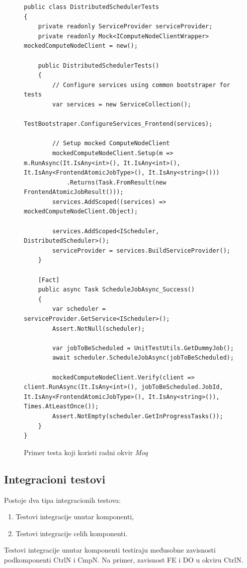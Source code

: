 \documentclass[12pt,oneside]{memoir}
\begin{document}
\begin{figure}[h!]
\centering
\begin{lstlisting}
public class DistributedSchedulerTests
{
	private readonly ServiceProvider serviceProvider;
	private readonly Mock<IComputeNodeClientWrapper> mockedComputeNodeClient = new();

	public DistributedSchedulerTests()
	{
		// Configure services using common bootstraper for tests
		var services = new ServiceCollection();
		TestBootstraper.ConfigureServices_Frontend(services);

		// Setup mocked ComputeNodeClient
		mockedComputeNodeClient.Setup(m => m.RunAsync(It.IsAny<int>(), It.IsAny<int>(), It.IsAny<FrontendAtomicJobType>(), It.IsAny<string>()))
			.Returns(Task.FromResult(new FrontendAtomicJobResult()));
		services.AddScoped((services) => mockedComputeNodeClient.Object);

		services.AddScoped<IScheduler, DistributedScheduler>();
		serviceProvider = services.BuildServiceProvider();
	}

	[Fact]
	public async Task ScheduleJobAsync_Success()
	{
		var scheduler = serviceProvider.GetService<IScheduler>();
		Assert.NotNull(scheduler);

		var jobToBeScheduled = UnitTestUtils.GetDummyJob();
		await scheduler.ScheduleJobAsync(jobToBeScheduled);

		mockedComputeNodeClient.Verify(client => client.RunAsync(It.IsAny<int>(), jobToBeScheduled.JobId, It.IsAny<FrontendAtomicJobType>(), It.IsAny<string>()), Times.AtLeastOnce());
		Assert.NotEmpty(scheduler.GetInProgressTasks());
	}
}
\end{lstlisting}
\caption{Primer testa koji koristi radni okvir \emph{Moq}}
\label{fig:testscheduler}
\end{figure}

\subsection{Integracioni testovi}

Postoje dva tipa integracionih testova:
\begin{enumerate}
\item Testovi integracije unutar komponenti,
\item Testovi integracije celih komponenti.
\end{enumerate} 

Testovi integracije unutar komponenti testiraju međusobne zavisnosti podkomponenti CtrlN i CmpN. Na primer, zavisnost FE i DO u okviru CtrlN.
\end{document}
